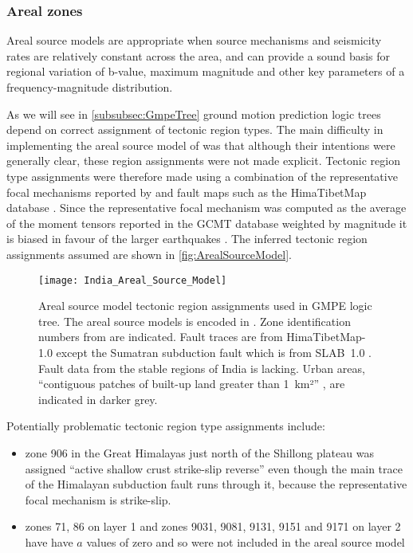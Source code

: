 \documentclass{article}
\begin{document}
\subsubsection{Areal zones}
\label{subsubsec:Areal}

Areal source models are appropriate when source mechanisms and seismicity rates are relatively constant across the area, and can provide a sound basis for regional variation of b-value, maximum magnitude and other key parameters of a frequency-magnitude distribution. 

As we will see in \autoref{subsubsec:GmpeTree} ground motion prediction logic trees depend on correct assignment of tectonic region types. The main difficulty in implementing the areal source model of  \cite{nath2012probabilistic} was that although their intentions were generally clear, these region assignments were not made explicit. Tectonic region type assignments were therefore made using a combination of the representative focal mechanisms reported by \cite{nath2012probabilistic} and fault maps such as the HimaTibetMap database \citep{styron2010database}. Since the representative focal mechanism was computed as the average of the moment tensors reported in the GCMT database weighted by magnitude it is biased in favour of the larger earthquakes \citep{thingbaijam2011seismogenic}. The inferred tectonic region assignments assumed are shown in \autoref{fig:ArealSourceModel}.

\begin{figure}[!htb]
\begin{adjustbox}{center}
\texttt{[image: India\_Areal\_Source\_Model]}
\end{adjustbox}
\caption[Areal source model]{Areal source model tectonic region assignments used in GMPE logic tree. The areal source models is encoded in \texttt{}. Zone identification numbers from \cite{nath2012probabilistic} are indicated. Fault traces are from HimaTibetMap-1.0 \citep{styron2010database} except the Sumatran subduction fault which is from SLAB~1.0 \citep{hayes2012slab1}. Fault data from the stable regions of India is lacking. Urban areas, ``contiguous patches of built-up land greater than 1~km²'' \citep{schneider2009new}, are indicated in darker grey.}
\label{fig:ArealSourceModel}
\end{figure}

Potentially problematic tectonic region type assignments include:
\begin{itemize}
\item zone 906 in the Great Himalayas just north of the Shillong plateau was assigned ``active shallow crust strike-slip reverse'' even though the main trace of the Himalayan subduction fault runs through it, because the representative focal mechanism is strike-slip. 
\item zones 71, 86 on layer 1 and zones 9031, 9081, 9131, 9151 and 9171 on layer 2 have have $a$ values of zero and so were not included in the areal source model
\end{itemize}
\end{document}

